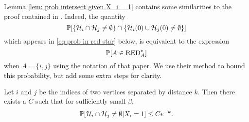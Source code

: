 	Lemma \ref{lem: prob intersect given X_i = 1} contains some similarities to the proof contained in \cite[Lemma 2.1]{Lubetzky2015-po}. Indeed, the quantity 
	\begin{equation}
		\mathbb{P}[\left\{\mathcal{H}_i \cap \mathcal{H}_j \neq \emptyset\right\} \cap \left\{\mathcal{H}_i(0) \cup \mathcal{H}_j(0) \neq \emptyset\right\}]
	\end{equation}
	which appears in \eqref{eq:prob in red star} below, is equivalent to the  expression
	\begin{equation}
		\mathbb{P}[A \in \mathrm{RED}_A^*]
	\end{equation}
	when $A = \{i, j\}$ using the notation of that paper. We use their method to bound this probability, but add some extra steps for clarity.
	
	\begin{lemma}
		\label{lem: prob intersect given X_i = 1}
		Let $i$ and $j$ be the indices of two vertices separated by distance $k$. Then there exists a $C$ such that for sufficiently small $\beta$,
		\begin{equation}
			\mathbb{P}[\mathcal{H}_i \cap \mathcal{H}_j \neq \emptyset | X_i = 1] \leq Ce^{-k}.
		\end{equation}
	\end{lemma}
